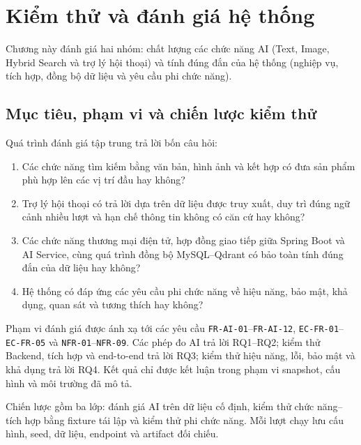
\section{Kiểm thử và đánh giá hệ thống}

Chương này đánh giá hai nhóm: chất lượng các chức năng AI (Text, Image, Hybrid Search và trợ lý hội thoại) và tính đúng đắn của hệ thống (nghiệp vụ, tích hợp, đồng bộ dữ liệu và yêu cầu phi chức năng).

\subsection{Mục tiêu, phạm vi và chiến lược kiểm thử}

Quá trình đánh giá tập trung trả lời bốn câu hỏi:

\begin{enumerate}[label=\textbf{RQ\arabic*:},leftmargin=1.8cm]
    \item Các chức năng tìm kiếm bằng văn bản, hình ảnh và kết hợp có đưa sản phẩm phù hợp lên các vị trí đầu hay không?
    \item Trợ lý hội thoại có trả lời dựa trên dữ liệu được truy xuất, duy trì đúng ngữ cảnh nhiều lượt và hạn chế thông tin không có căn cứ hay không?
    \item Các chức năng thương mại điện tử, hợp đồng giao tiếp giữa Spring Boot và AI Service, cùng quá trình đồng bộ MySQL--Qdrant có bảo toàn tính đúng đắn của dữ liệu hay không?
    \item Hệ thống có đáp ứng các yêu cầu phi chức năng về hiệu năng, bảo mật, khả dụng, quan sát và tương thích hay không?
\end{enumerate}

Phạm vi đánh giá được ánh xạ tới các yêu cầu \texttt{FR-AI-01}--\texttt{FR-AI-12}, \texttt{EC-FR-01}--\texttt{EC-FR-05} và \texttt{NFR-01}--\texttt{NFR-09}. Các phép đo AI trả lời RQ1--RQ2; kiểm thử Backend, tích hợp và end-to-end trả lời RQ3; kiểm thử hiệu năng, lỗi, bảo mật và khả dụng trả lời RQ4. Kết quả chỉ được kết luận trong phạm vi snapshot, cấu hình và môi trường đã mô tả.

Chiến lược gồm ba lớp: đánh giá AI trên dữ liệu cố định, kiểm thử chức năng--tích hợp bằng fixture tái lập và kiểm thử phi chức năng. Mỗi lượt chạy lưu cấu hình, seed, dữ liệu, endpoint và artifact đối chiếu.


